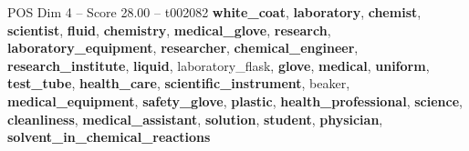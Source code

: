 \begin{textsample}{POS Dim 4 – Score 28.00 – t002082}  \label{ex:f4_pos_028}
\textbf{white\_coat}, \textbf{laboratory}, \textbf{chemist}, \textbf{scientist}, \textbf{fluid}, \textbf{chemistry}, \textbf{medical\_glove}, \textbf{research}, \textbf{laboratory\_equipment}, \textbf{researcher}, \textbf{chemical\_engineer}, \textbf{research\_institute}, \textbf{liquid}, laboratory\_flask, \textbf{glove}, \textbf{medical}, \textbf{uniform}, \textbf{test\_tube}, \textbf{health\_care}, \textbf{scientific\_instrument}, beaker, \textbf{medical\_equipment}, \textbf{safety\_glove}, \textbf{plastic}, \textbf{health\_professional}, \textbf{science}, \textbf{cleanliness}, \textbf{medical\_assistant}, \textbf{solution}, \textbf{student}, \textbf{physician}, \textbf{solvent\_in\_chemical\_reactions}

\end{textsample}
